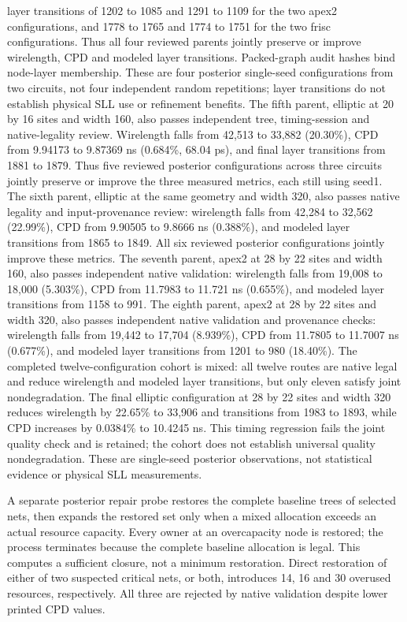 \documentclass[10pt]{article}
\begin{document}
layer transitions of 1202 to 1085 and 1291 to 1109 for the two apex2
configurations, and 1778 to 1765 and 1774 to 1751 for the two frisc
configurations. Thus all four reviewed parents jointly preserve or improve
wirelength, CPD and modeled layer transitions. Packed-graph audit hashes
bind node-layer membership. These are four posterior single-seed
configurations from two circuits, not four independent random repetitions;
layer transitions do not establish physical SLL use or refinement benefits.
The fifth parent, elliptic at 20 by 16 sites and width 160, also passes
independent tree, timing-session and native-legality review. Wirelength
falls from 42,513 to 33,882 (20.30\%), CPD from 9.94173 to 9.87369 ns
(0.684\%, 68.04 ps), and final layer transitions from 1881 to 1879.
Thus five reviewed posterior configurations across three circuits jointly
preserve or improve the three measured metrics, each still using seed1.
The sixth parent, elliptic at the same geometry and width 320, also passes
native legality and input-provenance review: wirelength falls from 42,284
to 32,562 (22.99\%), CPD from 9.90505 to 9.8666 ns (0.388\%), and
modeled layer transitions from 1865 to 1849. All six reviewed posterior
configurations jointly improve these metrics. The seventh parent, apex2 at
28 by 22 sites and width 160, also passes independent native validation:
wirelength falls from 19,008 to 18,000 (5.303\%), CPD from 11.7983 to
11.721 ns (0.655\%), and modeled layer transitions from 1158 to 991.
The eighth parent, apex2 at 28 by 22 sites and width 320, also passes
independent native validation and provenance checks: wirelength falls from
19,442 to 17,704 (8.939\%), CPD from 11.7805 to 11.7007 ns
(0.677\%), and modeled layer transitions from 1201 to 980 (18.40\%).
The completed twelve-configuration cohort is mixed: all twelve routes are
native legal and reduce wirelength and modeled layer transitions, but only
eleven satisfy joint nondegradation. The final elliptic configuration at
28 by 22 sites and width 320 reduces wirelength by 22.65\% to 33,906
and transitions from 1983 to 1893, while CPD increases by 0.0384\% to
10.4245 ns. This timing regression fails the joint quality check and is
retained; the cohort does not establish universal quality nondegradation. These are single-seed posterior observations,
not statistical evidence or physical SLL measurements.

A separate posterior repair probe restores the complete baseline trees of
selected nets, then expands the restored set only when a mixed allocation
exceeds an actual resource capacity. Every owner at an overcapacity node
is restored; the process terminates because the complete baseline allocation
is legal. This computes a sufficient closure, not a minimum restoration.
Direct restoration of either of two suspected critical nets, or both,
introduces 14, 16 and 30 overused resources, respectively. All three are
rejected by native validation despite lower printed CPD values.
\end{document}
